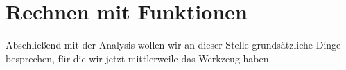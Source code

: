 \section{Rechnen mit Funktionen}
	Abschließend mit der Analysis wollen wir an dieser Stelle grundsätzliche Dinge
	besprechen, für die wir jetzt mittlerweile das Werkzeug haben.

	

	
